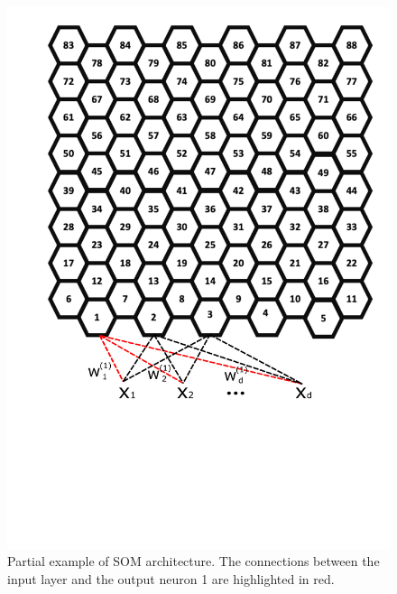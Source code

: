\begin{figure}[h!]
\centering
\includegraphics[scale=0.35]{"Part 3 - Learning Systems/Unsupervised Learning/Self-Organizing Maps/figs/arquitetura.pdf"}
\vspace{-3cm}
\caption{Partial example of SOM architecture. The connections between the input layer and the output neuron 1 are highlighted in red.}
\label{fig:architecuture}
\end{figure}



